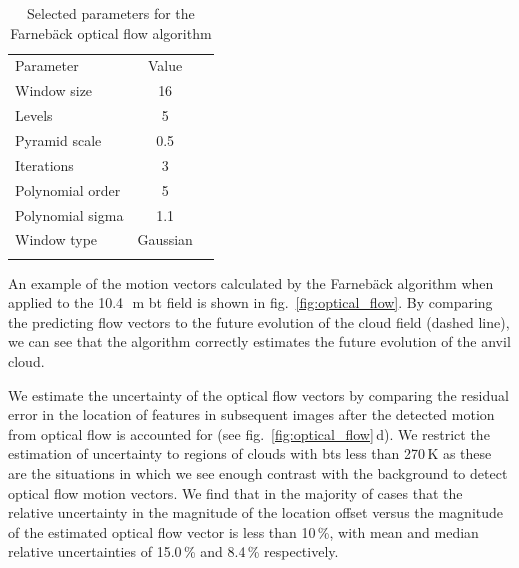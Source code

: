 \begin{table}[t]
\centering
\begin{tabular}{lcr}
\tophline
Parameter        & Value    \\ 
\middlehline
Window size      & 16       \\
Levels           & 5        \\
Pyramid scale    & 0.5      \\
Iterations       & 3        \\
Polynomial order & 5        \\
Polynomial sigma & 1.1      \\
Window type      & Gaussian \\
\bottomhline
\end{tabular}
\caption[
    Selected parameters for the Farnebäck optical flow algorithm
    ]{
    Selected parameters for the Farnebäck optical flow algorithm
    }
\label{table:parameters}
\end{table}

An example of the motion vectors calculated by the Farnebäck algorithm when applied to the 10.4\,\unit{\mu m} \acrshort{bt} field is shown in fig.~\ref{fig:optical_flow}.
By comparing the predicting flow vectors to the future evolution of the cloud field (dashed line), we can see that the algorithm correctly estimates the future evolution of the anvil cloud.

We estimate the uncertainty of the optical flow vectors by comparing the residual error in the location of features in subsequent images after the detected motion from optical flow is accounted for (see fig.~\ref{fig:optical_flow}\,d).
We restrict the estimation of uncertainty to regions of clouds with \acrshort{bt}s less than 270\,\unit{K} as these are the situations in which we see enough contrast with the background to detect optical flow motion vectors.
We find that in the majority of cases that the relative uncertainty in the magnitude of the location offset versus the magnitude of the estimated optical flow vector is less than 10\,\%, with mean and median relative uncertainties of 15.0\,\% and 8.4\,\% respectively.

